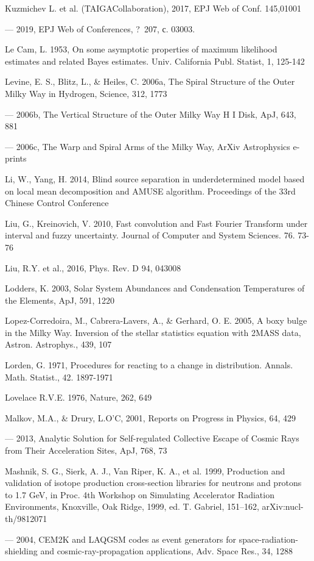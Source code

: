 Kuzmichev L. et al. (TAIGACollaboration), 2017, EPJ Web of Conf. 145,01001

--- 2019, EPJ Web of Conferences, ? 207, с. 03003. 

Le Cam, L. 1953, On some asymptotic properties of maximum likelihood estimates and related Bayes estimates. Univ. California Publ. Statist, 1, 125-142

Levine, E. S., Blitz, L., \& Heiles, C. 2006a, The Spiral Structure of the Outer Milky Way in Hydrogen, Science, 312, 1773

--- 2006b, The Vertical Structure of the Outer Milky Way H I Disk, ApJ, 643, 881

--- 2006c, The Warp and Spiral Arms of the Milky Way, ArXiv Astrophysics e-prints

Li, W., Yang, H. 2014, Blind source separation in underdetermined model based on local mean decomposition and AMUSE algorithm. Proceedings of the 33rd Chinese Control Conference

Liu, G., Kreinovich, V. 2010, Fast convolution and Fast Fourier Transform under interval and fuzzy uncertainty. Journal of Computer and System Sciences. 76. 73-76

Liu, R.Y. et al., 2016, Phys. Rev. D 94, 043008

Lodders, K. 2003, Solar System Abundances and Condensation Temperatures of the Elements, ApJ, 591, 1220

Lopez-Corredoira, M., Cabrera-Lavers, A., \& Gerhard, O. E. 2005, A boxy bulge in the Milky Way. Inversion of the stellar statistics equation with 2MASS data, Astron. Astrophys., 439, 107

Lorden, G. 1971, Procedures for reacting to a change in distribution. Annals. Math. Statist., 42. 1897-1971

Lovelace R.V.E. 1976, Nature, 262, 649

Malkov, M.A., \& Drury, L.O'C, 2001, Reports on Progress in Physics, 64, 429

--- 2013, Analytic Solution for Self-regulated Collective Escape of Cosmic Rays from Their Acceleration Sites, ApJ, 768, 73

Mashnik, S. G., Sierk, A. J., Van Riper, K. A., et al. 1999, Production and validation of isotope production cross-section libraries for neutrons and protons to 1.7 GeV, in Proc. 4th Workshop on Simulating Accelerator Radiation Environments, Knoxville, Oak Ridge, 1999, ed. T. Gabriel, 151--162, arXiv:nucl-th/9812071

--- 2004, CEM2K and LAQGSM codes as event generators for space-radiation-shielding and cosmic-ray-propagation applications, Adv. Space Res., 34, 1288

